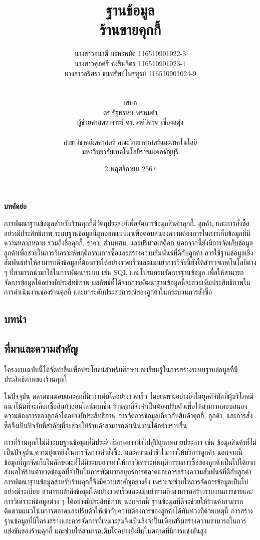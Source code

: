 \documentclass{report}
\title{ฐานข้อมูล\\ร้านขายคุกกี้}
\author{    
\begin{tabular}{ll}
	นางสาวอนาตี มะหะหมัด 116510901022-3\\นางสาวศุภศรี คงชื่นจิตร 116510901023-1\\นางสาวอริศรา ธนทรัพย์ไพรฑูรย์ 116510901024-9
\end{tabular}\\ 
\\
เสนอ\\
ดร.รัฐพรหม พรหมคำ\\
ผู้ช่วยศาสตราจารย์ ดร.วงศ์วิศรุต เขื่องสตุ่ง\\
\\
สาขาวิชาคณิตศาสตร์ คณะวิทยาศาสตร์และเทคโนโลยี\\
มหาวิทยาลัยเทคโนโลยีราชมงคลธัญบุรี
}
\date{2 พฤศจิกายน 2567}
\begin{document}
\maketitle
\tableofcontents
\listoffigures

\pagebreak

\begin{center}
\textbf{บทคัดย่อ } 
\end{center}
การพัฒนาฐานข้อมูลสําหรับร้านคุกกี้มีวัตถุประสงค์เพื่อจัดการข้อมูลสินค้าคุกกี้, ลูกค้า, และการสั่งซื้ออย่างมีประสิทธิภาพ ระบบฐานข้อมูลนี้ถูกออกแบบมาเพื่อตอบสนองความต้องการในการเก็บข้อมูลที่มีความหลากหลาย รวมถึงชื่อคุกกี้, ราคา, ส่วนผสม, และปริมาณสต็อก นอกจากนี้ยังมีการจัดเก็บข้อมูลลูกค้าเพื่อช่วยในการวิเคราะห์พฤติกรรมการซื้อและสร้างความสัมพันธ์ที่ดีกับลูกค้า การใช้ฐานข้อมูลเชิงสัมพันธ์ทําให้สามารถดึงข้อมูลที่ต้องการได้อย่างรวดเร็วและแม่นยําการวิจัยนี้ยังได้สํารวจเทคโนโลยีต่าง ๆ ที่สามารถนำมาใช้ในการพัฒนาระบบ เช่น SQL และโปรแกรมจัดการฐานข้อมูล เพื่อให้สามารถจัดการข้อมูลได้อย่างมีประสิทธิภาพ ผลลัพธ์ที่ได้จากการพัฒนาฐานข้อมูลนี้จะช่วยเพิ่มประสิทธิภาพในการดําเนินงานของร้านคุกกี้ และยกระดับประสบการณ์ของลูกค้าในกระบวนการสั่งซื้อ

\begin{center}
\chapter{บทนำ}
\end{center}
\section{ที่มาและความสำคัญ}
โครงงานฉบับนี้ได้จัดทําขึ้นเพื่อประโยชน์สําหรับศึกษาและเรียนรู้ในการสร้างระบบฐานข้อมูลที่มีประสิทธิภาพของร้านคุกกี้ \par

ในปัจจุบัน ตลาดขนมอบและคุกกี้มีการเติบโตอย่างรวดเร็ว โดยเฉพาะอย่างยิ่งในยุคดิจิทัลที่ผู้บริโภคมีแนวโน้มที่จะเลือกซื้อสินค้าออนไลน์มากขึ้น ร้านคุกกี้จึงจําเป็นต้องปรับตัวเพื่อให้สามารถตอบสนองความต้องการของลูกค้าได้อย่างมีประสิทธิภาพ การจัดการข้อมูลเกี่ยวกับสินค้าคุกกี้, ลูกค้า, และการสั่งซื้อจึงเป็นปัจจัยที่สําคัญที่จะช่วยให้ร้านค้าสามารถดําเนินงานได้อย่างราบรื่น

การที่ร้านคุกกี้ไม่มีระบบฐานข้อมูลที่มีประสิทธิภาพอาจนําไปสู่ปัญหาหลายประการ เช่น ข้อมูลสินค้าที่ไม่เป็นปัจจุบัน,ความยุ่งเหยิงในการจัดการคำสั่งซื้อ, และความล่าช้าในการให้บริการลูกค้า นอกจากนี้ ข้อมูลที่ถูกจัดเก็บในลักษณะที่ไม่มีระบบอาจทําให้การวิเคราะห์พฤติกรรมการซื้อของลูกค้าเป็นไปได้ยาก ส่งผลให้ร้านค้าขาดข้อมูลที่จําป็นในการพัฒนากลยุทธ์การตลาดและการสร้างความสัมพันธ์ที่ดีกับลูกค้า
การพัฒนาฐานข้อมูลสำหรับร้านคุกกี้จึงมีความสำคัญอย่างยิ่ง เพราะจะช่วยให้การจัดการข้อมูลเป็นไปอย่างมีระเบียบ สามารถเข้าถึงข้อมูลได้อย่างรวดเร็วและแม่นยํารวมถึงสามารถสร้างรายงานการขายและการวิเคราะห์ข้อมูลต่าง ๆ ได้อย่างมีประสิทธิภาพ นอกจากนี้ ฐานข้อมูลที่ดีจะช่วยให้ร้านค้าสามารถติดตามแนวโน้มการตลาดและปรับตัวให้เข้ากับความต้องการของลูกค้าได้ทันท่วงทีด้วยเหตุนี้ การสร้างฐานข้อมูลที่มีโครงสร้างและการจัดการที่เหมาะสมจึงเป็นสิ่งจําป็นเพื่อเสริมสร้างความสามารถในการแข่งขันของร้านคุกกี้ และช่วยให้สามารถเติบโตอย่างยั่งยืนในตลาดที่มีการแข่งขันสูง\par
\end{document}
